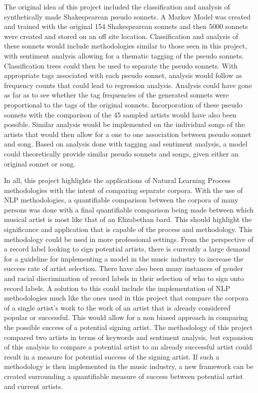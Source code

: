 \documentclass[10pt,a4paper]{article}
\begin{document}
\noindent The original idea of this project included the classification and analysis of synthetically made Shakespearean pseudo sonnets. A Markov Model was created and trained with the original 154 Shakespearean sonnets and then 5000 sonnets were created and stored on an off site location. Classification and analysis of these sonnets would include methodologies similar to those seen in this project, with sentiment analysis allowing for a thematic tagging of the pseudo sonnets. Classification trees could then be used to separate the pseudo sonnets. With appropriate tags associated with each pseudo sonnet, analysis would follow as frequency counts that could lead to regression analysis. Analysis could have gone as far as to see whether the tag frequencies of the generated sonnets were proportional to the tags of the original sonnets. Incorporation of these pseudo sonnets with the comparison of the 45 sampled artists would have also been possible. Similar analysis would be implemented on the individual songs of the artists that would then allow for a one to one association between pseudo sonnet and song. Based on analysis done with tagging and sentiment analysis, a model could theoretically provide similar pseudo sonnets and songs, given either an original sonnet or song.

\noindent In all, this project highlights the applications of Natural Learning Process methodologies with the intent of comparing separate corpora. With the use of NLP methodologies, a quantifiable comparison between the corpora of many persons was done with a final quantifiable comparison being made between which musical artist is most like that of an Elizabethan bard. This should highlight the significance and application that is capable of the process and methodology. This methodology could be used in more professional settings. From the perspective of a record label looking to sign potential artists, there is currently a large demand for a guideline for implementing a model in the music industry to increase the success rate of artist selection\cite{seifert}. There have also been many instances of gender and racial discrimination of record labels in their selection of who to sign onto record labels\cite{aguiar}. A solution to this could include the implementation of NLP methodologies much like the ones used in this project that compare the corpora of a single artist's work to the work of an artist that is already considered popular or successful. This would allow for a non biased approach in comparing the possible success of a potential signing artist. The methodology of this project compared two artists in terms of keywords and sentiment analysis, but expansion of this analysis to compare a potential artist to an already successful artist could result in a measure for potential success of the signing artist. If such a methodology is then implemented in the music industry, a new framework can be created surrounding a quantifiable measure of success between potential artist and current artists. 

\newpage 


 


\end{document}
